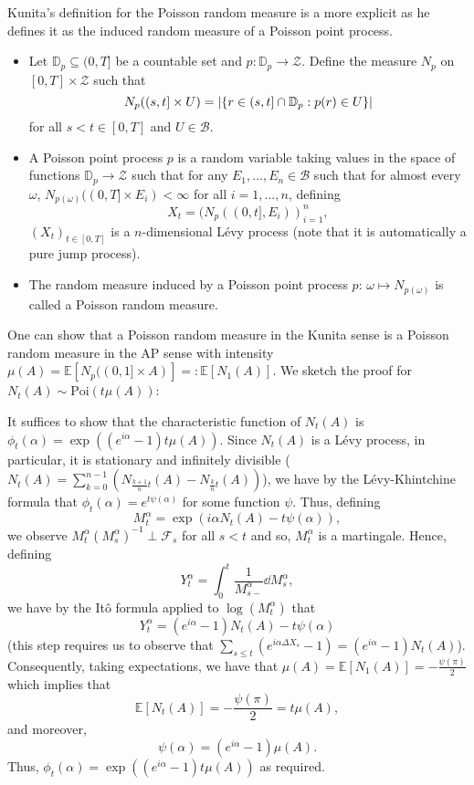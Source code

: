 \documentclass[]{article}
\theoremstyle{definition}
\theoremstyle{definition}
\begin{document}
Kunita's definition for the Poisson random measure is a more explicit as he defines it as the induced random 
measure of a Poisson point process. 
\begin{itemize}
  \item Let \(\mathbb{D}_p \subseteq (0, T]\) be a countable set and \(p : \mathbb{D}_p \to \mathcal{Z}\).
    Define the measure \(N_p\) on \([0, T] \times \mathcal{Z}\) such that  
    \[N_p((s, t] \times U) = \abs{\{r \in (s, t] \cap \mathbb{D}_p : p(r) \in U\}}\]
    for all \(s < t \in [0, T]\) and \(U \in \mathcal{B}\).
  \item A Poisson point process \(p\) is a random variable taking values in the space of functions 
    \(\mathbb{D}_p \to \mathcal{Z}\) such that for any \(E_1, \dots, E_n \in \mathcal{B}\) such that 
    for almost every \(\omega\), \(N_{p(\omega)}((0, T] \times E_i) < \infty\) for all \(i = 1, \dots, n\), 
    defining 
    \[X_t = (N_p((0, t], E_i))_{i = 1}^n,\]
    \((X_t)_{t \in [0, T]}\) is a \(n\)-dimensional L\'evy process (note that it is automatically a pure jump process).
  \item The random measure induced by a Poisson point process \(p\): \(\omega \mapsto N_{p(\omega)}\) 
    is called a Poisson random measure.
\end{itemize}

One can show that a Poisson random measure in the Kunita sense is a Poisson random measure in the AP sense 
with intensity \(\mu(A) = \mathbb{E}[N_p((0, 1] \times A)] =: \mathbb{E}[N_1(A)]\). We sketch the proof 
for \(N_t(A) \sim \text{Poi}(t\mu(A))\):

It suffices to show that the characteristic function of \(N_t(A)\) is \(\phi_t(\alpha) = \exp((e^{i\alpha} - 1)t\mu(A))\).
Since \(N_t(A)\) is a L\'evy process, in particular, it is stationary and infinitely divisible 
(\(N_t(A) = \sum_{k = 0}^{n - 1} (N_{\frac{k + 1}{n}t}(A) - N_{\frac{k}{n}t}(A))\)), 
we have by the L\'evy-Khintchine formula that \(\phi_t(\alpha) = e^{t\psi(\alpha)}\) for some function \(\psi\). Thus, defining 
\[M_t^\alpha = \exp(i\alpha N_t(A) - t \psi(\alpha)),\]
we observe \(M_t^\alpha (M_s^\alpha)^{-1} \perp \mathcal{F}_s\) for all \(s < t\) and so, \(M_t^\alpha\) is a martingale.
Hence, defining 
\[Y_t^\alpha = \int_0^t \frac{1}{M_{s-}^\alpha} \dd M_s^\alpha,\]
we have by the It\^o formula applied to \(\log(M_t^\alpha)\) that
\[Y_t^\alpha = (e^{i\alpha} - 1)N_t(A) - t\psi(\alpha)\]
(this step requires us to observe that 
\(\sum_{s \le t} (e^{i\alpha \Delta X_s} - 1) = (e^{i\alpha} - 1)N_t(A)\)). 
Consequently, taking expectations, we have that 
\(\mu(A) = \mathbb{E}[N_1(A)] = -\frac{\psi(\pi)}{2}\) which implies that 
\[\mathbb{E}[N_t(A)] = -\frac{\psi(\pi)}{2} = t \mu(A),\]
and moreover, 
\[\psi(\alpha) = (e^{i\alpha} - 1)\mu(A).\]
Thus, \(\phi_t(\alpha) = \exp((e^{i\alpha} - 1)t\mu(A))\) as required.
\end{document}
